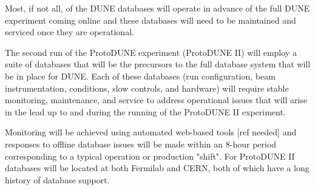 Most, if not all, of the DUNE databases will operate in advance of the full DUNE experiment coming online and these databases will need to be maintained and serviced once they are operational. 

The second run of the ProtoDUNE experiment (ProtoDUNE II) will employ a suite of databases that will be the precursors to the full database system that will be in place for DUNE. Each of these databases (run configuration, beam instrumentation, conditions, slow controls, and hardware) will require stable monitoring, maintenance, and service to address operational issues that will arise in the lead up to and during the running of the ProtoDUNE II experiment. 

Monitoring will be achieved using automated web-based tools [ref needed] and responses to offline database issues will be made within an 8-hour period corresponding to a typical operation or production "shift". For ProtoDUNE II databases will be located at both Fermilab and CERN, both of which have a long history of database support.